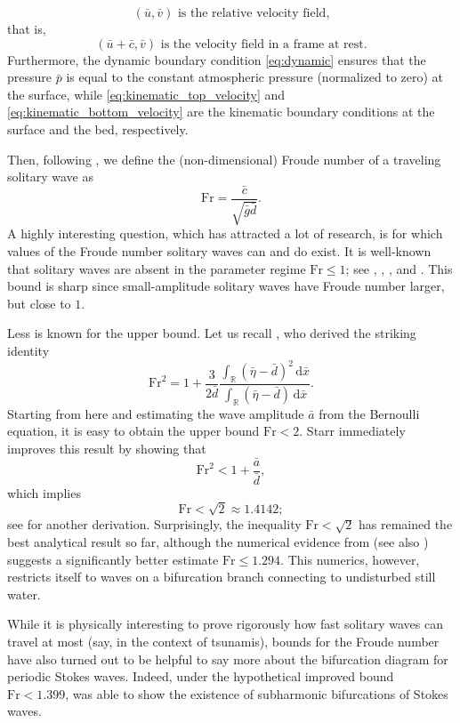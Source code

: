 \documentclass{amsart}
\theoremstyle{definition}
\newcommand{\R}{\mathbb R}
\newcommand{\dd}{\mathrm d}
\newcommand{\Fr}{\textrm{Fr}}
\begin{document}
\[(\bar u,\bar v)\text{ is the relative velocity field,}\]
that is,
\[(\bar u+\bar c,\bar v)\text{ is the velocity field in a frame at rest.}\]
Furthermore, the dynamic boundary condition \eqref{eq:dynamic} ensures that the pressure $\bar p$ is equal to the constant atmospheric pressure (normalized to zero) at the surface, while \eqref{eq:kinematic_top_velocity} and \eqref{eq:kinematic_bottom_velocity} are the kinematic boundary conditions at the surface and the bed, respectively.

Then, following \cite{froude1874experiments}, we define the (non-dimensional) Froude number of a traveling solitary wave as
\begin{equation}\label{eq:def_Fr}
	\Fr = \frac{\bar c}{\sqrt{\bar g\bar d}}.
\end{equation}
A highly interesting question, which has attracted a lot of research, is for which values of the Froude number solitary waves can and do exist. It is well-known that solitary waves are absent in the parameter regime $\Fr \leq 1$; see \cite{Starr47}, \cite{AmickToland81b}, \cite{mcleod}, and \cite{KozlovLokharuWheeler21}. This bound is sharp since small-amplitude solitary waves have Froude number larger, but close to $1$.

Less is known for the upper bound. Let us recall \cite{Starr47}, who derived the striking identity
\[
\Fr^2 = 1+ \frac{3}{2\bar d} \frac{\int_\R (\bar \eta - \bar d)^2\,\dd \bar x}{\int_\R (\bar \eta - \bar d)\,\dd \bar x}.
\]
Starting from here and estimating the wave amplitude $\bar a$ from the Bernoulli equation, it is easy to obtain the upper bound $\Fr < 2$. Starr immediately improves this result by showing that
\begin{equation} \label{starr}
	\Fr^2 < 1 + \frac{\bar a}{\bar d},
\end{equation}
which implies
\begin{equation}\label{eq:Starr_sqrt2}
	\Fr < \sqrt{2} \approx 1.4142;
\end{equation}
see \cite{kp} for another derivation. Surprisingly, the inequality $\Fr < \sqrt{2}$ has remained the best analytical result so far, although the numerical evidence from \cite{Longuet-Higgins1974-py} (see also \cite{Miles1980}) suggests a significantly better estimate $\Fr \leq 1.294$. This numerics, however, restricts itself to waves on a bifurcation branch connecting to undisturbed still water.

While it is physically interesting to prove rigorously how fast solitary waves can travel at most (say, in the context of tsunamis), bounds for the Froude number have also turned out to be helpful to say more about the bifurcation diagram for periodic Stokes waves.
Indeed, under the hypothetical improved bound $\Fr < 1.399$, \cite{Kozlov2023-sw} was able to show the existence of subharmonic bifurcations of Stokes waves.
\end{document}
